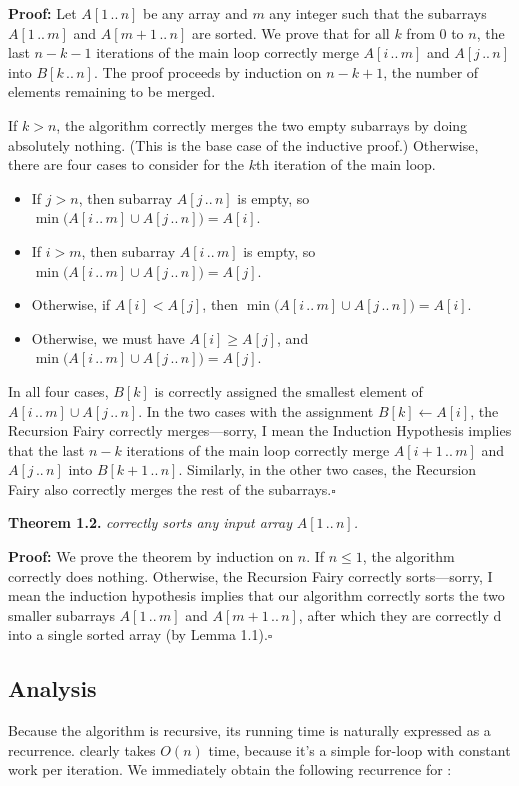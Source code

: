 \noindent\textbf{Proof:} Let $A[1\,..\,n]$ be any array and $m$ any integer such that the subarrays $A[1\,..\,m]$ and $A[m +1\,..\,n]$ are sorted. We prove that for all $k$ from $0$ to $n$, the last $n - k - 1$ iterations of the main loop correctly merge $A[i\,..\,m]$ and $A[j\,..\,n]$ into $B[k\,..\,n]$. The proof proceeds by induction on $n - k + 1$, the number of elements remaining to be merged.

If $k > n$, the algorithm correctly merges the two empty subarrays by doing absolutely nothing. (This is the base case of the inductive proof.) Otherwise, there are four cases to consider for the $k$th iteration of the main loop.
\begin{itemize}
\item If $j > n$, then subarray $A[j\,..\,n]$ is empty, so $\min \bigl(A[i\,..\,m] \cup A[j\,..\,n]\bigr) = A[i]$.
\item If $i > m$, then subarray $A[i\,..\,m]$ is empty, so $\min \bigl(A[i\,..\,m] \cup A[j\,..\,n]\bigr) = A[j]$.
\item Otherwise, if $A[i] < A[j]$, then $\min \bigl(A[i\,..\,m] \cup A[j\,..\,n]\bigr) = A[i]$.
\item Otherwise, we must have $A[i] \ge A[j]$, and $\min \bigl(A[i\,..\,m] \cup A[j\,..\,n]\bigr) = A[j]$.
\end{itemize}
In all four cases, $B[k]$ is correctly assigned the smallest element of $A[i\,..\,m] \cup A[j\,..\,n]$. In the two cases with the assignment $B[k] \gets A[i]$, the Recursion Fairy correctly merges—sorry, I mean the Induction Hypothesis implies that the last $n - k$ iterations of the main loop correctly merge $A[i + 1\,..\,m]$ and $A[j\,..\,n]$ into $B[k + 1\,..\,n]$. Similarly, in the other two cases, the Recursion Fairy also correctly merges the rest of the subarrays.\hfill$\square$

\noindent\textbf{Theorem 1.2.} \textsl{ correctly sorts any input array} $A[1\,..\,n]$\textsl{.}

\noindent\textbf{Proof:} We prove the theorem by induction on $n$. If $n \le 1$, the algorithm correctly does nothing. Otherwise, the Recursion Fairy correctly sorts—sorry, I mean the induction hypothesis implies that our algorithm correctly sorts the two smaller subarrays $A[1\,..\,m]$ and $A[m + 1\,..\,n]$, after which they are correctly d into a single sorted array (by Lemma 1.1).\hfill$\square$

\subsection{Analysis}
Because the  algorithm is recursive, its running time is naturally expressed as a recurrence.  clearly takes $O(n)$ time, because it’s a simple for-loop with constant work per iteration. We immediately obtain the following recurrence for :

